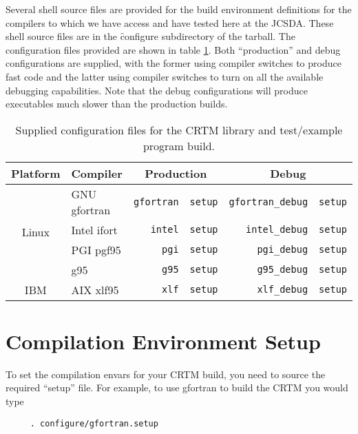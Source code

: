 Several shell source files are provided for the build environment definitions for the compilers to which we have access and have tested here at the JCSDA. These shell source files are in the \f{configure} subdirectory of the tarball. The configuration files provided are shown in table \ref{tab:supplied_configurations}. Both ``production'' and debug configurations are supplied, with the former using compiler switches to produce fast code and the latter using compiler switches to turn on all the available debugging capabilities. Note that the debug configurations will produce executables much slower than the production builds. 
\begin{table}[htp]
  \centering
  \begin{tabular}{clr@{.}lr@{.}l}
    \hline
    \sffamily\textbf{Platform} & \sffamily\textbf{Compiler} & \multicolumn{2}{c}{\sffamily\textbf{Production}} & \multicolumn{2}{c}{\sffamily\textbf{Debug}} \\
    \hline\hline
    \multirow{4}{*}{Linux} & GNU gfortran          & \texttt{gfortran}&\texttt{setup} & \texttt{gfortran\_debug}&\texttt{setup}\\
                           & Intel ifort           & \texttt{intel}&\texttt{setup}    & \texttt{intel\_debug}&\texttt{setup}   \\
                           & PGI pgf95             & \texttt{pgi}&\texttt{setup}      & \texttt{pgi\_debug}&\texttt{setup}     \\
                           & g95                   & \texttt{g95}&\texttt{setup}      & \texttt{g95\_debug}&\texttt{setup}     \\[0.2cm]
    IBM                    & AIX xlf95             & \texttt{xlf}&\texttt{setup}      & \texttt{xlf\_debug}&\texttt{setup}     \\
  \hline
  \end{tabular}
  \caption{Supplied configuration files for the CRTM library and test/example program build.}
  \label{tab:supplied_configurations}
\end{table}


\section{Compilation Environment Setup}
To set the compilation envars for your CRTM build, you need to source the required ``setup'' file. For example, to use gfortran to build the CRTM you would type

\begin{verbatim}     . configure/gfortran.setup\end{verbatim}

